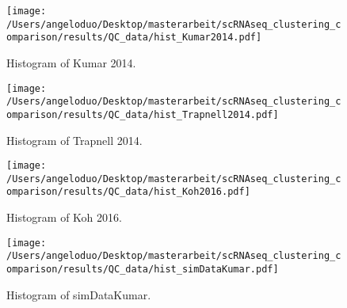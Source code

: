 \documentclass[12pt, a4paper]{article}\usepackage[]{graphicx}\usepackage[]{color}
\begin{document}
\clearpage


\begin{figure}[!h]
\centering

\texttt{[image: /Users/angeloduo/Desktop/masterarbeit/scRNAseq\_clustering\_comparison/results/QC\_data/hist\_Kumar2014.pdf]}
\caption{Histogram of Kumar 2014.}
\label{fig:histkumar}
\end{figure}

\begin{figure}[!h]
\centering

\texttt{[image: /Users/angeloduo/Desktop/masterarbeit/scRNAseq\_clustering\_comparison/results/QC\_data/hist\_Trapnell2014.pdf]}
\caption{Histogram of Trapnell 2014. }
\label{fig:histtrap}
\end{figure}

\begin{figure}[!h]
\centering

\texttt{[image: /Users/angeloduo/Desktop/masterarbeit/scRNAseq\_clustering\_comparison/results/QC\_data/hist\_Koh2016.pdf]}
\caption{Histogram of Koh 2016. }
\label{fig:histkoh}
\end{figure}


\begin{figure}[!h]
\centering

\texttt{[image: /Users/angeloduo/Desktop/masterarbeit/scRNAseq\_clustering\_comparison/results/QC\_data/hist\_simDataKumar.pdf]}
\caption{Histogram of simDataKumar. }
\label{fig:histsim}
\end{figure}
\end{document}
